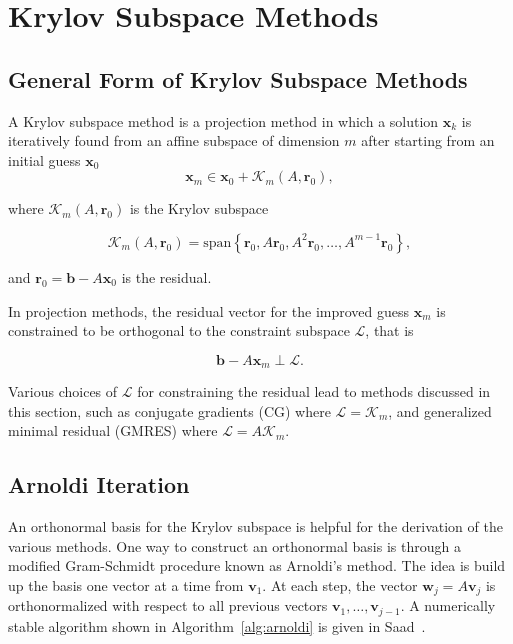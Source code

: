 \chapter{Krylov Subspace Methods}
\label{chapter:KrylovSolvers}
\section{General Form of Krylov Subspace Methods}
A Krylov subspace method is a projection method in which a solution $\mathbf{x}_k$ is iteratively found from an affine subspace of dimension $m$ after starting from an initial guess $\mathbf{x}_0$
\begin{equation}
    \mathbf{x}_m \in \mathbf{x}_0 + \mathcal{K}_m(A, \mathbf{r}_0),
\end{equation}

where $\mathcal{K}_m(A, \mathbf{r}_0)$ is the Krylov subspace

\begin{equation}
    \mathcal{K}_m(A, \mathbf{r}_0) = \text{span}\left\{\mathbf{r}_0, A\mathbf{r}_0, A^2\mathbf{r}_0, \ldots, A^{m-1}\mathbf{r}_0 \right\},
\end{equation}

and $\mathbf{r}_0 = \mathbf{b} - A\mathbf{x}_0$ is the residual.

In projection methods, the residual vector for the improved guess $\mathbf{x}_m$ is constrained to be orthogonal to the constraint subspace $\mathcal{L}$, that is

\begin{equation}
    \label{eq:constraint_space}
    \mathbf{b} - A\mathbf{x}_m \perp \mathcal{L}.
\end{equation}

Various choices of $\mathcal{L}$ for constraining the residual lead to methods discussed in this section, such as conjugate gradients (CG) where $\mathcal{L} = \mathcal{K}_m$, and generalized minimal residual (GMRES) where $\mathcal{L} = A\mathcal{K}_m$.

\section{Arnoldi Iteration}
An orthonormal basis for the Krylov subspace is helpful for the derivation of the various methods. One way to construct an orthonormal basis is through a modified Gram-Schmidt procedure known as Arnoldi's method. The idea is build up the basis one vector at a time from $\mathbf{v}_1$. At each step, the vector $\mathbf{w}_j = A\mathbf{v}_j$ is orthonormalized with respect to all previous vectors $\mathbf{v}_1, \ldots, \mathbf{v}_{j-1}$. A numerically stable algorithm shown in Algorithm~\ref{alg:arnoldi} is given in Saad~\cite{Saad2003}.

